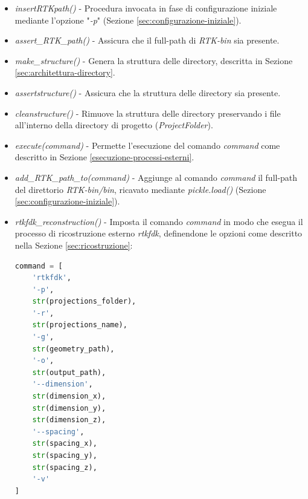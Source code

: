 \documentclass[a4paper,12pt, doubleside]{report}
\begin{document}
                \begin{itemize}
                        
                    \item \textit{insert\textunderscore RTK\textunderscore path()} - Procedura invocata in fase di configurazione iniziale mediante l'opzione "\textit{-p}" (Sezione \ref{sec:configurazione-iniziale}).
                        
                    \item \textit{assert\_RTK\_path()} - Assicura che il full-path di \textit{RTK-bin} sia presente.
                        
                    \item \textit{make\_structure()} - Genera la struttura delle directory, descritta in Sezione \ref{sec:architettura-directory}.
                        
                    \item \textit{assert\textunderscore structure()} - Assicura che la struttura delle directory sia presente.
                        
                    \item \textit{clean\textunderscore structure()} - Rimuove la struttura delle directory preservando i file all'interno della directory di progetto (\textit{ProjectFolder}).
                        
                    \item \textit{execute(command)} - Permette l'esecuzione del comando \textit{command} come descritto in Sezione \ref{esecuzione-processi-esterni}.
                        
                    \item \textit{add\_RTK\_path\_to(command)} - Aggiunge al comando \textit{command} il full-path del direttorio \textit{RTK-bin/bin}, ricavato mediante \textit{pickle.load()} (Sezione \ref{sec:configurazione-iniziale}).
                        
                    \item \textit{rtkfdk\_reconstruction()} - Imposta il comando \textit{command} in modo che esegua il processo di ricostruzione esterno \textit{rtkfdk}, definendone le opzioni come descritto nella Sezione \ref{sec:ricostruzione}:
                        
                    \begin{lstlisting}[language=python, frame=bt]
command = [
    'rtkfdk',
    '-p',
    str(projections_folder),
    '-r',
    str(projections_name),
    '-g',
    str(geometry_path),
    '-o',
    str(output_path),
    '--dimension',
    str(dimension_x),
    str(dimension_y),
    str(dimension_z),
    '--spacing',
    str(spacing_x),
    str(spacing_y),
    str(spacing_z),
    '-v'
]
                    \end{lstlisting}
                        

\end{itemize}
\end{document}
